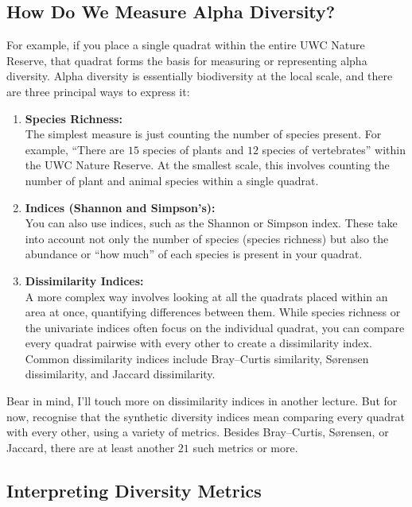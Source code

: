\documentclass[
  11pt,
]{book}
\begin{document}
\subsection{How Do We Measure Alpha
Diversity?}\label{how-do-we-measure-alpha-diversity}

For example, if you place a single quadrat within the entire UWC Nature
Reserve, that quadrat forms the basis for measuring or representing
alpha diversity. Alpha diversity is essentially biodiversity at the
local scale, and there are three principal ways to express it:

\begin{enumerate}
\def\labelenumi{\arabic{enumi}.}
\item
  \textbf{Species Richness:}\\
  The simplest measure is just counting the number of species present.
  For example, ``There are \(15\) species of plants and \(12\) species
  of vertebrates'' within the UWC Nature Reserve. At the smallest scale,
  this involves counting the number of plant and animal species within a
  single quadrat.
\item
  \textbf{Indices (Shannon and Simpson's):}\\
  You can also use indices, such as the Shannon or Simpson index. These
  take into account not only the number of species (species richness)
  but also the abundance or ``how much'' of each species is present in
  your quadrat.
\item
  \textbf{Dissimilarity Indices:}\\
  A more complex way involves looking at all the quadrats placed within
  an area at once, quantifying differences between them. While species
  richness or the univariate indices often focus on the individual
  quadrat, you can compare every quadrat pairwise with every other to
  create a dissimilarity index. Common dissimilarity indices include
  Bray--Curtis similarity, Sørensen dissimilarity, and Jaccard
  dissimilarity.
\end{enumerate}

Bear in mind, I'll touch more on dissimilarity indices in another
lecture. But for now, recognise that the synthetic diversity indices
mean comparing every quadrat with every other, using a variety of
metrics. Besides Bray--Curtis, Sørensen, or Jaccard, there are at least
another \(21\) such metrics or more.

\subsection{Interpreting Diversity
Metrics}\label{interpreting-diversity-metrics}
\end{document}
